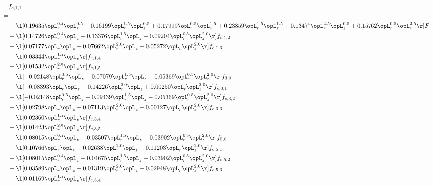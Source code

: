 \begin{alignat}{2} 
\label{eq:f_11_2} 
& f_{c,1,1} \nonumber \\ 
 = \\ 
& + \l[  0.19635 \opL_r^{0.5} \opL_z^{0.5} +  0.16199 \opL_r^{1.5} \opL_z^{0.5} +  0.17999 \opL_r^{0.5} \opL_z^{1.5} +  0.23859 \opL_r^{1.5} \opL_z^{1.5} +  0.13477 \opL_r^{2.5} \opL_z^{0.5} +  0.15762 \opL_r^{0.5} \opL_z^{2.5}  \r] F \nonumber \\ 
& - \l[  0.14726 \opL_r^{0.5} \opL_z +  0.13376 \opL_r^{1.5} \opL_z +  0.09204 \opL_r^{0.5} \opL_z^{2.0}  \r] f_{c,1,2} \nonumber \\ 
& + \l[  0.07177 \opL_r \opL_z +  0.07662 \opL_r^{2.0} \opL_z +  0.05272 \opL_r \opL_z^{2.0}  \r] f_{c,1,3} \nonumber \\ 
& - \l[  0.03344 \opL_r^{1.5} \opL_z  \r] f_{c,1,4} \nonumber \\ 
& + \l[  0.01532 \opL_r^{2.0} \opL_z  \r] f_{c,1,5} \nonumber \\ 
& + \l[  -0.02148 \opL_r^{0.5} \opL_z +  0.07079 \opL_r^{1.5} \opL_z   -0.05369 \opL_r^{0.5} \opL_z^{2.0}  \r] f_{3,0} \nonumber \\ 
& + \l[  -0.08393 \opL_r \opL_z   -0.14226 \opL_r^{2.0} \opL_z +  0.00250 \opL_r \opL_z^{2.0}  \r] f_{c,3,1} \nonumber \\ 
& + \l[  -0.02148 \opL_r^{0.5} \opL_z +  0.09439 \opL_r^{1.5} \opL_z   -0.05369 \opL_r^{0.5} \opL_z^{2.0}  \r] f_{c,3,2} \nonumber \\ 
& - \l[  0.02798 \opL_r \opL_z +  0.07113 \opL_r^{2.0} \opL_z +  0.00127 \opL_r \opL_z^{2.0}  \r] f_{c,3,3} \nonumber \\ 
& + \l[  0.02360 \opL_r^{1.5} \opL_z  \r] f_{c,3,4} \nonumber \\ 
& - \l[  0.01423 \opL_r^{2.0} \opL_z  \r] f_{c,3,5} \nonumber \\ 
& + \l[  0.08015 \opL_r^{0.5} \opL_z +  0.03507 \opL_r^{1.5} \opL_z +  0.03902 \opL_r^{0.5} \opL_z^{2.0}  \r] f_{5,0} \nonumber \\ 
& - \l[  0.10766 \opL_r \opL_z +  0.02638 \opL_r^{2.0} \opL_z +  0.11203 \opL_r \opL_z^{2.0}  \r] f_{c,5,1} \nonumber \\ 
& + \l[  0.08015 \opL_r^{0.5} \opL_z +  0.04675 \opL_r^{1.5} \opL_z +  0.03902 \opL_r^{0.5} \opL_z^{2.0}  \r] f_{c,5,2} \nonumber \\ 
& - \l[  0.03589 \opL_r \opL_z +  0.01319 \opL_r^{2.0} \opL_z +  0.02948 \opL_r \opL_z^{2.0}  \r] f_{c,5,3} \nonumber \\ 
& + \l[  0.01169 \opL_r^{1.5} \opL_z  \r] f_{c,5,4} \nonumber \\ 

\end{alignat}
